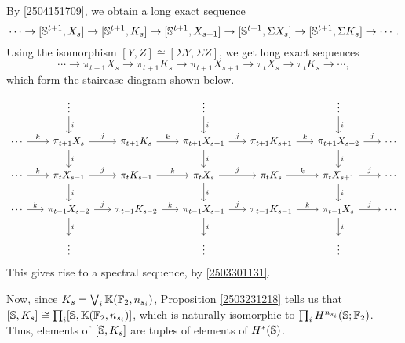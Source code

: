 \documentclass{MetricNotes2023}
\def\bb{\ensuremath\mathbb}
\begin{document}
By \ref{2504151709}, we obtain a long exact sequence
\[\cdots \to [\bb{S}^{t+1}, X_s] \to [\bb{S}^{t+1}, K_s] \to [\bb{S}^{t+1}, X_{s+1}]\to [\bb{S}^{t+1}, \Sigma X_s]\to [\bb{S}^{t+1}, \Sigma K_s] \to \cdots.\]
Using the isomorphism \([Y,Z]\cong [\Sigma Y, \Sigma Z]\), we get long exact sequences
\[\cdots \to \pi_{t+1}X_s \to \pi_{t+1}K_s \to \pi_{t+1}X_{s+1}\to \pi_t X_s\to \pi_t K_s \to \cdots,\]
which form the staircase diagram shown below.
\begin{equation}\label{2504201907}
\begin{tikzcd}[column sep=4ex]
   &  \vdots \arrow[d, "i"] &  & \vdots \arrow[d, "i"] &  & \vdots \arrow[d, "i"] & \\
 \cdots \arrow[r, "k"] & \pi_{t+1}X_s \arrow[d, "i"] \arrow[r, "j"] & \pi_{t+1}K_s  \arrow[r, "k"] & \pi_{t+1}X_{s+1} \arrow[d, "i"] \arrow[r, "j"] & \pi_{t+1}K_{s+1} \arrow[r, "k"] & \pi_{t+1}X_{s+2} \arrow[d, "i"] \arrow[r, "j"] & \cdots \\
 \cdots \arrow[r, "k"] & \pi_t X_{s-1} \arrow[d, "i"] \arrow[r, "j"] & \pi_t K_{s-1}  \arrow[r, "k"] & \pi_t X_s \arrow[d, "i"] \arrow[r, "j"] & \pi_t K_s \arrow[r, "k"] & \pi_t X_{s+1} \arrow[d, "i"] \arrow[r, "j"] & \cdots \\
 \cdots \arrow[r, "k"] & \pi_{t-1}X_{s-2}  \arrow[d, "i"] \arrow[r, "j"] & \pi_{t-1}K_{s-2}  \arrow[r, "k"] & \pi_{t-1}X_{s-1} \arrow[d, "i"] \arrow[r, "j"] & \pi_{t-1}K_{s-1} \arrow[r, "k"] & \pi_{t-1}X_s \arrow[d, "i"] \arrow[r, "j"] & \cdots \\
 & \vdots &  & \vdots & & \vdots &
\end{tikzcd}
\end{equation}
This gives rise to a spectral sequence, by \ref{2503301131}.

Now, since \(K_s = \bigvee_i \bb{K}(\bb{F}_2, n_{s_i})\), Proposition \ref{2503231218} tells us that \([\bb{S}, K_s]\cong \prod_i[\bb{S}, \bb{K}(\bb{F}_2, n_{s_i})]\), which is naturally isomorphic to \(\prod_i H^{n_{s_i}}(\bb{S}; \bb{F}_2)\). Thus, elements of \([\bb{S}, K_s]\) are tuples of elements of \(H^*(\bb{S})\).
\end{document}

